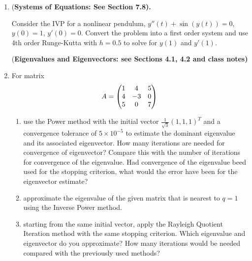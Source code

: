 \documentclass [12pt]{article}
\begin{document}
\begin{enumerate}
\item {(\bf Systems of Equations: See Section 7.8).}

Consider the IVP for a nonlinear pendulum, $ y''(t) + \sin
(y(t))  =0$, $y(0)=1$, $y'(0)=0 $. Convert the problem into a first
order system and use 4th order Runge-Kutta with $h=0.5$ to solve
for $y(1)$ and $y'(1)$.

\newpage

{(\bf Eigenvalues and Eigenvectors: see Sections 4.1, 4.2 and class notes)}

\item 

For matrix
%
\[
A=\begin{pmatrix}
 1 & 4 & 5 \cr 4 & -3 & 0 \cr 5 & 0 & 7
 \end{pmatrix}
\]
%

\begin{enumerate}

\item use the Power method with the initial vector $\frac{1}{\sqrt{3}}(1,1,1)^T$ and a convergence tolerance of $5\times 10^{-5}$ to estimate the dominant eigenvalue and its associated eigenvector. How many iterations are needed for convergence of eigenvector? Compare this with the number of iterations for convergence of the eigenvalue. Had convergence of the eigenvalue beed used for the stopping criterion, what would  the error have been for the eigenvector estimate?

\item approximate the eigenvalue of the given matrix that is nearest to $q=1$ using the Inverse Power method.

\item starting from the same initial vector, apply the Rayleigh Quotient Iteration method with the same stopping criterion. Which eigenvalue and eigenvector do you approximate? How many iterations would be needed compared with the previously used methods?

\end{enumerate}




\end{enumerate}
\end{document}
